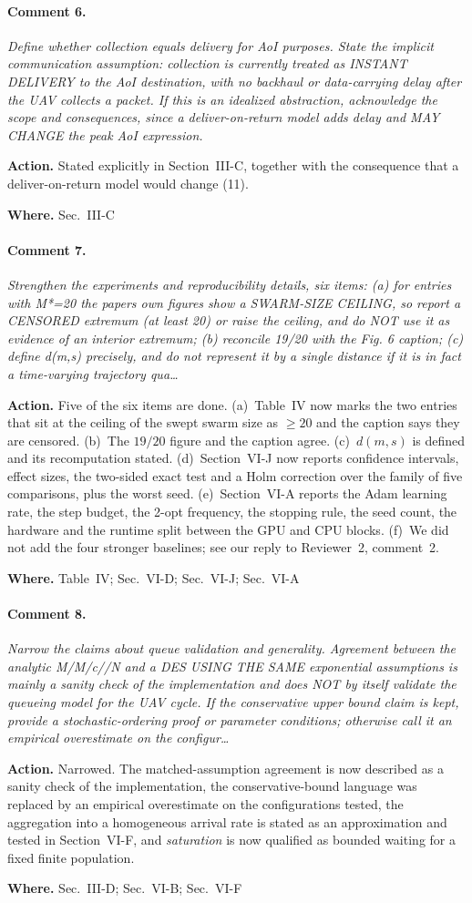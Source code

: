 \documentclass[10pt]{article}
\newcommand{\rev}[1]{\par\medskip\noindent\textit{#1}\par\smallskip}
\newcommand{\act}[2]{\noindent\textbf{Action.} #1\par\noindent\textbf{Where.} #2\par}
\begin{document}
\paragraph{Comment 6.}
\rev{Define whether collection equals delivery for AoI purposes. State the implicit communication assumption: collection is currently treated as INSTANT DELIVERY to the AoI destination, with no backhaul or data-carrying delay after the UAV collects a packet. If this is an idealized abstraction, acknowledge the scope and consequences, since a deliver-on-return model adds delay and MAY CHANGE the peak AoI expression.}
\act{Stated explicitly in Section~III-C, together with the consequence that a deliver-on-return model would change (11).}{Sec.~III-C}

\paragraph{Comment 7.}
\rev{Strengthen the experiments and reproducibility details, six items: (a) for entries with M*=20 the papers own figures show a SWARM-SIZE CEILING, so report a CENSORED extremum (at least 20) or raise the ceiling, and do NOT use it as evidence of an interior extremum; (b) reconcile 19/20 with the Fig. 6 caption; (c) define d(m,s) precisely, and do not represent it by a single distance if it is in fact a time-varying trajectory qua\dots}
\act{Five of the six items are done. (a)~Table~IV now marks the two entries that sit at the ceiling of the swept swarm size as $\ge 20$ and the caption says they are censored. (b)~The $19/20$ figure and the caption agree. (c)~$d(m,s)$ is defined and its recomputation stated. (d)~Section~VI-J now reports confidence intervals, effect sizes, the two-sided exact test and a Holm correction over the family of five comparisons, plus the worst seed. (e)~Section~VI-A reports the Adam learning rate, the step budget, the 2-opt frequency, the stopping rule, the seed count, the hardware and the runtime split between the GPU and CPU blocks. (f)~We did not add the four stronger baselines; see our reply to Reviewer~2, comment~2.}{Table~IV; Sec.~VI-D; Sec.~VI-J; Sec.~VI-A}

\paragraph{Comment 8.}
\rev{Narrow the claims about queue validation and generality. Agreement between the analytic M/M/c//N and a DES USING THE SAME exponential assumptions is mainly a sanity check of the implementation and does NOT by itself validate the queueing model for the UAV cycle. If the conservative upper bound claim is kept, provide a stochastic-ordering proof or parameter conditions; otherwise call it an empirical overestimate on the configur\dots}
\act{Narrowed. The matched-assumption agreement is now described as a sanity check of the implementation, the conservative-bound language was replaced by an empirical overestimate on the configurations tested, the aggregation into a homogeneous arrival rate is stated as an approximation and tested in Section~VI-F, and \emph{saturation} is now qualified as bounded waiting for a fixed finite population.}{Sec.~III-D; Sec.~VI-B; Sec.~VI-F}
\end{document}
